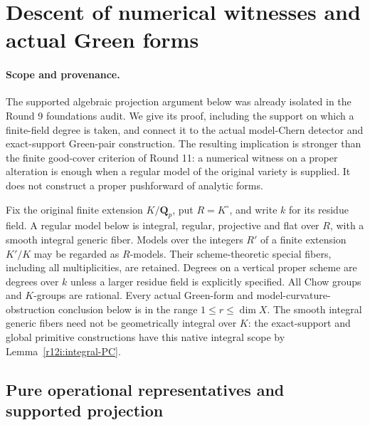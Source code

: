 \section{Descent of numerical witnesses and actual Green forms}
\label{r12a:section}

\paragraph{Scope and provenance.}
The supported algebraic projection argument below was already isolated
in the Round 9 foundations audit.  We give its proof, including the
support on which a finite-field degree is taken, and connect it to the
actual model-Chern detector and exact-support Green-pair construction.
The resulting implication is stronger than the finite good-cover
criterion of Round 11: a numerical witness on a proper alteration is
enough when a regular model of the original variety is supplied.
It does not construct a proper pushforward of analytic forms.

Fix the original finite extension $K/\mathbf Q_p$, put $R=K^\circ$,
and write $k$ for its residue field.  A regular model below is integral,
regular, projective and flat over $R$, with a smooth integral generic
fiber.  Models over the integers $R'$ of a finite extension $K'/K$
may be regarded as $R$-models.  Their scheme-theoretic special fibers,
including all multiplicities, are retained.  Degrees on a vertical
proper scheme are degrees over $k$ unless a larger residue field is
explicitly specified.  All Chow groups and $K$-groups are rational.
Every actual Green-form and model-curvature-obstruction conclusion below
is in the range $1\le r\le\dim X$.  The smooth integral generic fibers
need not be geometrically integral over $K$: the exact-support and global
primitive constructions have this native integral scope by
Lemma~\ref{r12i:integral-PC}.

\subsection{Pure operational representatives and supported projection}


